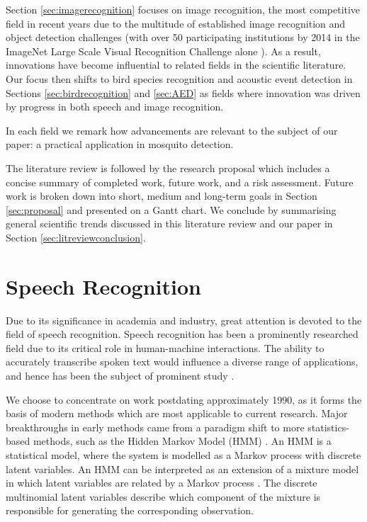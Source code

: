 \documentclass[12pt]{llncs}
\begin{document}
Section \ref{sec:imagerecognition} focuses on image recognition, the most competitive field in recent years due to the multitude of established image recognition and object detection challenges (with over 50 participating institutions by 2014 in the ImageNet Large Scale Visual Recognition Challenge alone \cite{russakovsky2014imagenet}). As a result, innovations have become influential to related fields in the scientific literature.
Our focus then shifts to bird species recognition and acoustic event detection in Sections \ref{sec:birdrecognition} and \ref{sec:AED} as fields where innovation was driven by progress in both speech and image recognition.

In each field we remark how advancements are relevant to the subject of our paper: a practical application in mosquito detection.

The literature review is followed by the research proposal which includes a concise summary of completed work, future work, and a risk assessment. Future work is broken down into short, medium and long-term goals in Section \ref{sec:proposal} and presented on a Gantt chart. We conclude by summarising general scientific trends discussed in this literature review and our paper in Section \ref{sec:litreviewconclusion}.



\section{Speech Recognition}
\label{sec:speechrecognition}
Due to its significance in academia and industry, great attention is devoted to the field of speech recognition. Speech recognition has been a prominently researched field due to its critical role in human-machine interactions. The ability to accurately transcribe spoken text would influence a diverse range of applications, and hence has been the subject of prominent study \cite{juang2005automatic}. 

We choose to concentrate on work postdating approximately 1990, as it forms the basis of modern methods which are most applicable to current research. Major breakthroughs in early methods came from a paradigm shift to more statistics-based methods, such as the Hidden Markov Model (HMM) \cite{juang2005automatic}. An HMM is a statistical model, where the system is modelled as a Markov process with discrete latent variables. An HMM can be interpreted as an extension of a mixture model \cite{lindsay1995mixture} in which latent variables are related by a Markov process \cite{bishop2006pattern}. The discrete multinomial latent variables describe which component of the mixture is responsible for generating the corresponding observation.
\end{document}
